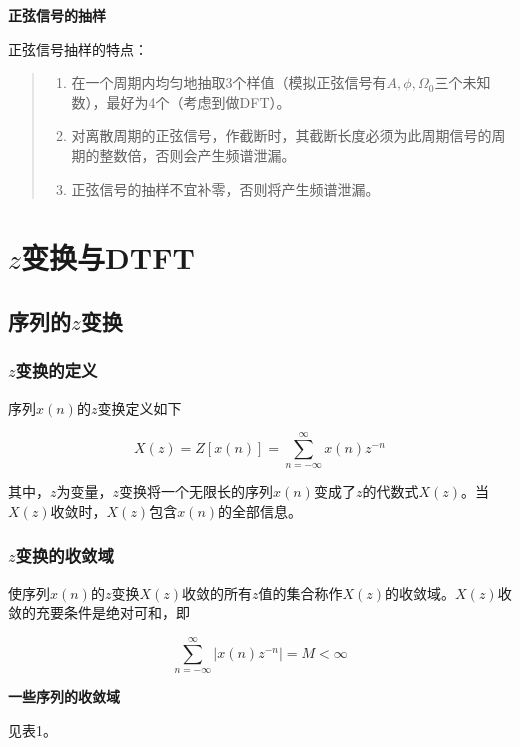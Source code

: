 \documentclass[cn, hazy, blue, normal, 14pt]{elegantnote}
\begin{document}
\textbf{正弦信号的抽样}

正弦信号抽样的特点：

\begin{quote}
\begin{enumerate}
    \item 在一个周期内均匀地抽取3个样值（模拟正弦信号有$A, \phi, \Omega_0$三个未知数），最好为4个（考虑到做DFT）。
    \item 对离散周期的正弦信号，作截断时，其截断长度必须为此周期信号的周期的整数倍，否则会产生频谱泄漏。
    \item 正弦信号的抽样不宜补零，否则将产生频谱泄漏。
\end{enumerate}
\end{quote}

\section{$z$变换与DTFT}

\subsection{序列的$z$变换}

\subsubsection{$z$变换的定义}

序列$x(n)$的$z$变换定义如下

\begin{equation}
        X(z)=Z[x(n)]=\sum_{n=-\infty}^{\infty}{x(n)z^{-n}}
\end{equation}

其中，$z$为变量，$z$变换将一个无限长的序列$x(n)$变成了$z$的代数式$X(z)$。当$X(z)$收敛时，$X(z)$包含$x(n)$的全部信息。

\subsubsection{$z$变换的收敛域}

使序列$x(n)$的$z$变换$X(z)$收敛的所有$z$值的集合称作$X(z)$的收敛域。$X(z)$收敛的充要条件是绝对可和，即

\begin{equation}
        \sum_{n=-\infty}^{\infty}|{x(n)z^{-n}}|=M<\infty
\end{equation}

\textbf{一些序列的收敛域}

见表1。
\end{document}
